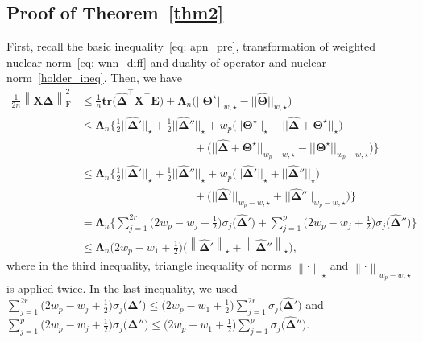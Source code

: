 \documentclass[12pt]{article}
\begin{document}
\subsection{Proof of Theorem~\ref{thm2}} \label{pf_thm_3_2}
First, recall the basic inequality~\eqref{eq: apn_pre}, transformation of weighted nuclear norm~\eqref{eq: wnn_diff} and duality of operator and nuclear norm~\eqref{holder_ineq}.
Then, we have
\begin{align}
    \frac{1}{2n} \left\| \boldsymbol{X} \boldsymbol{\widehat{\Delta}} \right\|_{\text{F}}^{2} 
    &\leq \frac{1}{n} \textbf{tr}\big( \boldsymbol{\widehat{\Delta}}^{\top} \boldsymbol{X}^{\top}\boldsymbol{E} \big) + 
    \boldsymbol{\Lambda}_{n} \big( ||\boldsymbol{\Theta^{\star}}||_{w,\star} - ||\widehat{\boldsymbol{\Theta}}||_{w,\star} \big) \nonumber \\
    &\leq \boldsymbol{\Lambda}_{n}\bigg\{ \frac{1}{2}||\boldsymbol{\widehat{\Delta}}'||_{\star} 
    + \frac{1}{2}||\boldsymbol{\widehat{\Delta}}''||_{\star}
    + w_{p}\big( ||\boldsymbol{\Theta^{\star}}||_{\star} - ||\boldsymbol{\widehat{\Delta}}  + \boldsymbol{\Theta^{\star}}||_{\star} \big) \nonumber \\
    &\qquad \qquad \qquad \qquad \qquad + \big( ||\boldsymbol{\widehat{\Delta}} + \boldsymbol{\Theta^{\star}}||_{w_{p}-w,\star} - ||\boldsymbol{\Theta^{\star}}||_{w_{p}-w,\star}\big)\bigg\} \nonumber \\
    &\leq \boldsymbol{\Lambda}_{n}\bigg\{ \frac{1}{2}||\boldsymbol{\widehat{\Delta}}'||_{\star} 
    + \frac{1}{2}||\boldsymbol{\widehat{\Delta}}''||_{\star}
    + w_{p}\big( ||\boldsymbol{\widehat{\Delta}}'||_{\star} + ||\boldsymbol{\widehat{\Delta}}''||_{\star} \big) \nonumber \\
    &\qquad \qquad \qquad \qquad \qquad + \big( ||\boldsymbol{\widehat{\Delta}}'||_{w_{p}-w,\star} + ||\boldsymbol{\widehat{\Delta}}''||_{w_{p}-w,\star}\big)\bigg\} \nonumber \\
    &=\boldsymbol{\Lambda}_{n}\bigg\{ \sum_{j=1}^{2r}\bigg(2w_{p}-w_{j}+\frac{1}{2}\bigg)\sigma_{j}\big(\boldsymbol{\widehat{\Delta}}'\big) + \sum_{j=1}^{p}\bigg(2w_{p}-w_{j}+\frac{1}{2}\bigg)\sigma_{j}\big(\boldsymbol{\widehat{\Delta}}''\big)\bigg\} \nonumber \\
    &\leq \boldsymbol{\Lambda}_{n} \bigg( 2w_{p}-w_{1}+\frac{1}{2} \bigg)
    \bigg( \left\|\boldsymbol{\widehat{\Delta}}'\right\|_{\star} + \left\|\boldsymbol{\widehat{\Delta}}'' \right\|_{\star} \bigg),  \label{eq: basic}
\end{align}
where in the third inequality, triangle inequality of norms $\left\| \cdot \right\|_{\star}$ and $\left\| \cdot \right\|_{w_{p}-w,\star}$ is applied twice.
In the last inequality, we used 
$\sum_{j=1}^{2r}\big(2w_{p}-w_{j}+\frac{1}{2}\big)\sigma_{j}\big(\boldsymbol{\widehat{\Delta}}'\big)\leq \big(2w_{p}-w_{1}+\frac{1}{2}\big) \sum_{j=1}^{2r}\sigma_{j}\big(\boldsymbol{\widehat{\Delta}}'\big)$ and 
$\sum_{j=1}^{p}\big(2w_{p}-w_{j}+\frac{1}{2}\big)\sigma_{j}\big(\boldsymbol{\widehat{\Delta}}''\big)\leq \big(2w_{p}-w_{1}+\frac{1}{2}\big) \sum_{j=1}^{p}\sigma_{j}\big(\boldsymbol{\widehat{\Delta}}''\big)$.
\end{document}

